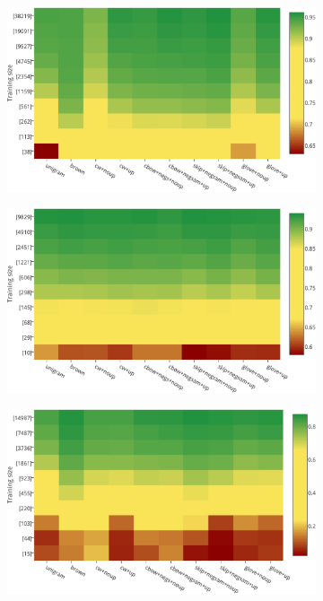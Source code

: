 \begin{figure}[t!]
\centering
\begin{subfigure}{7cm}
	\centering
    \includegraphics[scale=0.4]{plots/map-pos-color-invert}    	
	\subcaption{\pos (\accuracy)}	
	\label{pos}
\end{subfigure}
\begin{subfigure}{7cm}
	\centering
    \includegraphics[scale=0.4]{plots/map-chunk-color-invert}
	\subcaption{\chunking (\fscore)}	
	\label{chu}
\end{subfigure}
\begin{subfigure}{7cm}
	\centering
    \includegraphics[scale=0.4]{plots/map-ner-color-invert}    	

\end{subfigure}
\end{figure}
